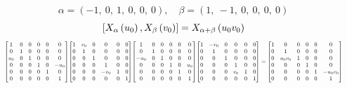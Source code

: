 \documentclass[11pt]{article}
\theoremstyle{definition}
\begin{document}
\[
\alpha = \left( -1, \  0, \  1, \  0, \  0, \  0\right), \quad \beta = \left( 1, \  -1, \  0, \  0, \  0, \  0\right)
\]
\[
\scaletoalign{\textwidth}{\left[ X_{\alpha}\left(u_{0}\right), X_{\beta}\left(v_{0}\right) \right] = X_{\alpha + \beta}\left(u_{0} v_{0}\right)}
\]
\[
\scaletoalign{\textwidth}{{\left[\begin{matrix}1 & 0 & 0 & 0 & 0 & 0\\0 & 1 & 0 & 0 & 0 & 0\\u_{0} & 0 & 1 & 0 & 0 & 0\\0 & 0 & 0 & 1 & 0 & - u_{0}\\0 & 0 & 0 & 0 & 1 & 0\\0 & 0 & 0 & 0 & 0 & 1\end{matrix}\right]} {\left[\begin{matrix}1 & v_{0} & 0 & 0 & 0 & 0\\0 & 1 & 0 & 0 & 0 & 0\\0 & 0 & 1 & 0 & 0 & 0\\0 & 0 & 0 & 1 & 0 & 0\\0 & 0 & 0 & - v_{0} & 1 & 0\\0 & 0 & 0 & 0 & 0 & 1\end{matrix}\right]} {\left[\begin{matrix}1 & 0 & 0 & 0 & 0 & 0\\0 & 1 & 0 & 0 & 0 & 0\\- u_{0} & 0 & 1 & 0 & 0 & 0\\0 & 0 & 0 & 1 & 0 & u_{0}\\0 & 0 & 0 & 0 & 1 & 0\\0 & 0 & 0 & 0 & 0 & 1\end{matrix}\right]} {\left[\begin{matrix}1 & - v_{0} & 0 & 0 & 0 & 0\\0 & 1 & 0 & 0 & 0 & 0\\0 & 0 & 1 & 0 & 0 & 0\\0 & 0 & 0 & 1 & 0 & 0\\0 & 0 & 0 & v_{0} & 1 & 0\\0 & 0 & 0 & 0 & 0 & 1\end{matrix}\right]} = {\left[\begin{matrix}1 & 0 & 0 & 0 & 0 & 0\\0 & 1 & 0 & 0 & 0 & 0\\0 & u_{0} v_{0} & 1 & 0 & 0 & 0\\0 & 0 & 0 & 1 & 0 & 0\\0 & 0 & 0 & 0 & 1 & - u_{0} v_{0}\\0 & 0 & 0 & 0 & 0 & 1\end{matrix}\right]}}
\]
\end{document}
